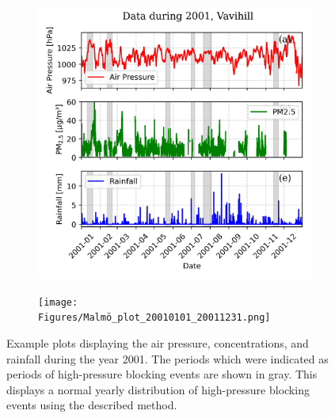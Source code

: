 \begin{figure}[H]
    \centering
    \begin{subfigure}[b]{0.49\textwidth}
        \centering
        \includegraphics[width=\textwidth]{Figures/Vavihill_plot_20010101_20011231.png}
        \label{fig:2001Vavihill}
    \end{subfigure}
    \hfill
    \begin{subfigure}[b]{0.49\textwidth}
        \centering
        \texttt{[image: Figures/Malmö\_plot\_20010101\_20011231.png]}
        \label{fig:2001Malmö}
    \end{subfigure}
    \caption{Example plots displaying the air pressure, \PM concentrations, and rainfall during the year 2001. The periods which were indicated as periods of high-pressure blocking events are shown in gray. This displays a normal yearly distribution of high-pressure blocking events using the described method.}
    \label{fig:2001}
\end{figure}

